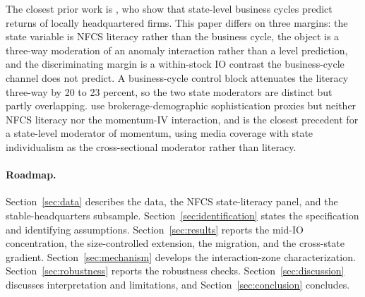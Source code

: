 The closest prior work is \citet{korniotisKumar2013}, who show that state-level business cycles predict returns of locally headquartered firms. This paper differs on three margins: the state variable is NFCS literacy rather than the business cycle, the object is a three-way moderation of an anomaly interaction rather than a level prediction, and the discriminating margin is a within-stock IO contrast the business-cycle channel does not predict. A business-cycle control block attenuates the literacy three-way by 20 to 23 percent, so the two state moderators are distinct but partly overlapping. \citet{korniotisKumarPage2020} use brokerage-demographic sophistication proxies but neither NFCS literacy nor the momentum-IV interaction, and \citet{hillertJacobsMuller2014} is the closest precedent for a state-level moderator of momentum, using media coverage with state individualism as the cross-sectional moderator rather than literacy.

\paragraph{Roadmap.} Section~\ref{sec:data} describes the data, the NFCS state-literacy panel, and the stable-headquarters subsample. Section~\ref{sec:identification} states the specification and identifying assumptions. Section~\ref{sec:results} reports the mid-IO concentration, the size-controlled extension, the migration, and the cross-state gradient. Section~\ref{sec:mechanism} develops the interaction-zone characterization. Section~\ref{sec:robustness} reports the robustness checks. Section~\ref{sec:discussion} discusses interpretation and limitations, and Section~\ref{sec:conclusion} concludes.
